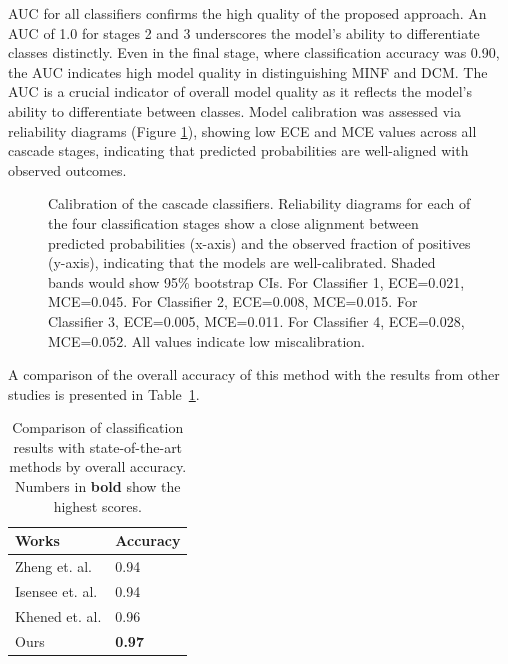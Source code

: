 \documentclass[fleqn,10pt]{wlscirep}
\begin{document}
AUC for all classifiers confirms the high quality of the proposed approach. An AUC of 1.0 for stages 2 and 3 underscores the model's ability to differentiate classes distinctly. Even in the final stage, where classification accuracy was 0.90, the AUC indicates high model quality in distinguishing MINF and DCM. The AUC is a crucial indicator of overall model quality as it reflects the model's ability to differentiate between classes. Model calibration was assessed via reliability diagrams (Figure \ref{fig:calibration}), showing low ECE and MCE values across all cascade stages, indicating that predicted probabilities are well-aligned with observed outcomes.

\begin{figure}[ht]
    \centering
    \caption{Calibration of the cascade classifiers. Reliability diagrams for each of the four classification stages show a close alignment between predicted probabilities (x-axis) and the observed fraction of positives (y-axis), indicating that the models are well-calibrated. Shaded bands would show 95\% bootstrap CIs. For Classifier 1, ECE=0.021, MCE=0.045. For Classifier 2, ECE=0.008, MCE=0.015. For Classifier 3, ECE=0.005, MCE=0.011. For Classifier 4, ECE=0.028, MCE=0.052. All values indicate low miscalibration.}
    \label{fig:calibration}
\end{figure}

A comparison of the overall accuracy of this method with the results from other studies is presented in Table~\ref{tab:classification_comparison_sota}.

\begin{table}[ht]
\centering
\caption{Comparison of classification results with state-of-the-art methods by overall accuracy. Numbers in \textbf{bold} show the highest scores.}
\label{tab:classification_comparison_sota}
\begin{tabular}{ll}
\toprule
\textbf{Works} & \textbf{Accuracy} \\
\midrule
Zheng et. al. \cite{Zheng:2019} & 0.94 \\
Isensee et. al. \cite{Isensee:2018} & 0.94 \\
Khened et. al. \cite{Khened:2019} & 0.96 \\
Ours & \textbf{0.97} \\
\bottomrule
\end{tabular}
\end{table}
\end{document}
